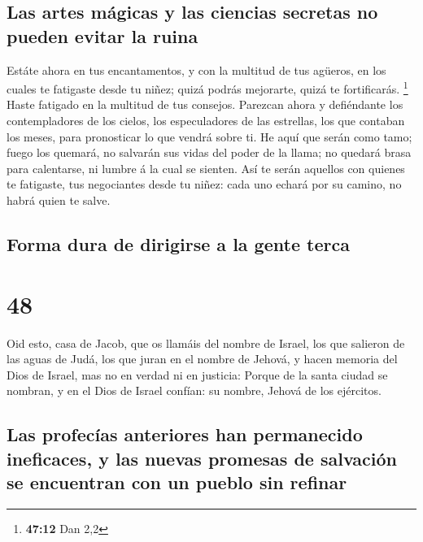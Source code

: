 \hypertarget{las-artes-muxe1gicas-y-las-ciencias-secretas-no-pueden-evitar-la-ruina}{%
\subsection{Las artes mágicas y las ciencias secretas no pueden evitar
la
ruina}\label{las-artes-muxe1gicas-y-las-ciencias-secretas-no-pueden-evitar-la-ruina}}

 Estáte ahora en tus encantamentos, y con la multitud de
tus agüeros, en los cuales te fatigaste desde tu niñez; quizá podrás
mejorarte, quizá te fortificarás. \footnote{\textbf{47:12} Dan 2,2}
 Haste fatigado en la multitud de tus consejos. Parezcan
ahora y defiéndante los contempladores de los cielos, los especuladores
de las estrellas, los que contaban los meses, para pronosticar lo que
vendrá sobre ti.  He aquí que serán como tamo; fuego los
quemará, no salvarán sus vidas del poder de la llama; no quedará brasa
para calentarse, ni lumbre á la cual se sienten.  Así te
serán aquellos con quienes te fatigaste, tus negociantes desde tu niñez:
cada uno echará por su camino, no habrá quien te salve.

\hypertarget{forma-dura-de-dirigirse-a-la-gente-terca}{%
\subsection{Forma dura de dirigirse a la gente
terca}\label{forma-dura-de-dirigirse-a-la-gente-terca}}

\hypertarget{section-47}{%
\section{48}\label{section-47}}

 Oid esto, casa de Jacob, que os llamáis del nombre de
Israel, los que salieron de las aguas de Judá, los que juran en el
nombre de Jehová, y hacen memoria del Dios de Israel, mas no en verdad
ni en justicia:  Porque de la santa ciudad se nombran, y
en el Dios de Israel confían: su nombre, Jehová de los ejércitos.

\hypertarget{las-profecuxedas-anteriores-han-permanecido-ineficaces-y-las-nuevas-promesas-de-salvaciuxf3n-se-encuentran-con-un-pueblo-sin-refinar}{%
\subsection{Las profecías anteriores han permanecido ineficaces, y las
nuevas promesas de salvación se encuentran con un pueblo sin
refinar}\label{las-profecuxedas-anteriores-han-permanecido-ineficaces-y-las-nuevas-promesas-de-salvaciuxf3n-se-encuentran-con-un-pueblo-sin-refinar}}

